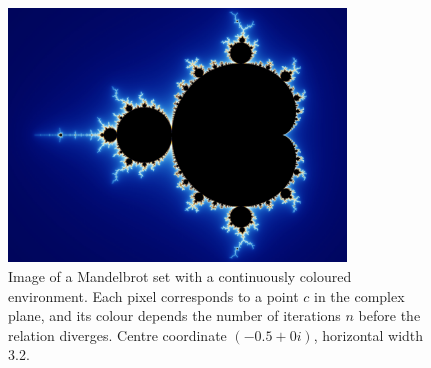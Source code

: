 %
\begin{figure}[htbp]
    \begin{center}
        \includegraphics[width=0.8\textwidth]{images/sec-5/mandelbrot}
    \end{center}
    \caption[The Mandelbrot fractal]{Image of a Mandelbrot set with a
        continuously coloured environment. Each pixel corresponds to a point $c$
        in the complex plane, and its colour depends the number of iterations
        $n$ before the relation diverges. Centre coordinate
        $\left( -0.5+0i \right)$, horizontal width 3.2.}
    \label{fig:mandelbrot}
\end{figure}

